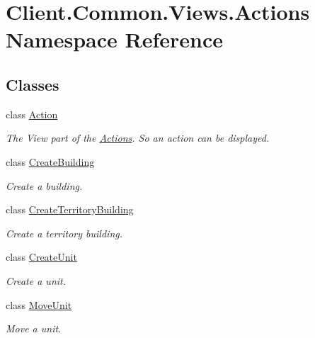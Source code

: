 \hypertarget{namespaceClient_1_1Common_1_1Views_1_1Actions}{}\section{Client.\+Common.\+Views.\+Actions Namespace Reference}
\label{namespaceClient_1_1Common_1_1Views_1_1Actions}
\subsection*{Classes}
\begin{DoxyCompactItemize}
\item 
class \hyperlink{classClient_1_1Common_1_1Views_1_1Actions_1_1Action}{Action}
\begin{DoxyCompactList}\small\item\em The View part of the \hyperlink{namespaceClient_1_1Common_1_1Views_1_1Actions}{Actions}. So an action can be displayed. \end{DoxyCompactList}\item 
class \hyperlink{classClient_1_1Common_1_1Views_1_1Actions_1_1CreateBuilding}{Create\+Building}
\begin{DoxyCompactList}\small\item\em Create a building. \end{DoxyCompactList}\item 
class \hyperlink{classClient_1_1Common_1_1Views_1_1Actions_1_1CreateTerritoryBuilding}{Create\+Territory\+Building}
\begin{DoxyCompactList}\small\item\em Create a territory building. \end{DoxyCompactList}\item 
class \hyperlink{classClient_1_1Common_1_1Views_1_1Actions_1_1CreateUnit}{Create\+Unit}
\begin{DoxyCompactList}\small\item\em Create a unit. \end{DoxyCompactList}\item 
class \hyperlink{classClient_1_1Common_1_1Views_1_1Actions_1_1MoveUnit}{Move\+Unit}
\begin{DoxyCompactList}\small\item\em Move a unit. \end{DoxyCompactList}\end{DoxyCompactItemize}
